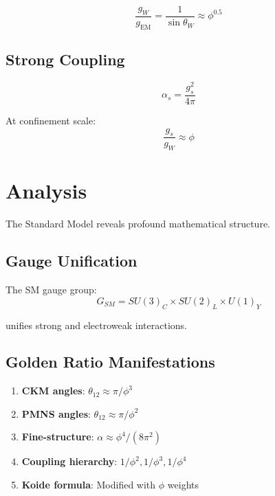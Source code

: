 \begin{theorem}
\label{thm:weak-golden}
\begin{equation}
\frac{g_W}{g_{\text{EM}}} = \frac{1}{\sin\theta_W} \approx \phi^{0.5}
\end{equation}
\end{theorem}

\subsection{Strong Coupling}

\begin{equation}
\alpha_s = \frac{g_s^2}{4\pi}
\end{equation}

\begin{theorem}
\label{thm:strong-golden}
At confinement scale:
\begin{equation}
\frac{g_s}{g_W} \approx \phi
\end{equation}
\end{theorem}

\section{Analysis}

The Standard Model reveals profound mathematical structure.

\subsection{Gauge Unification}

\begin{theorem}
\label{thm:sm-symmetry}
The SM gauge group:
\begin{equation}
G_{SM} = SU(3)_C \times SU(2)_L \times U(1)_Y
\end{equation}

unifies strong and electroweak interactions.
\end{theorem}

\subsection{Golden Ratio Manifestations}

\begin{enumerate}
\item \textbf{CKM angles}: $\theta_{12} \approx \pi/\phi^3$
\item \textbf{PMNS angles}: $\theta_{12} \approx \pi/\phi^2$
\item \textbf{Fine-structure}: $\alpha \approx \phi^4/(8\pi^2)$
\item \textbf{Coupling hierarchy}: $1/\phi^2, 1/\phi^3, 1/\phi^4$
\item \textbf{Koide formula}: Modified with $\phi$ weights
\end{enumerate}

